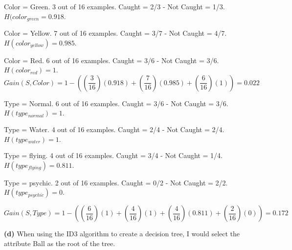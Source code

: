 \documentclass[11pt]{article}
\renewcommand\part[1]{\vspace{.10in}\textbf{(#1)}}
\begin{document}
 \par

Color = Green. 3 out of 16 examples. Caught = 2/3 - Not Caught = 1/3. $H(color_{green} = 0.918$.

Color = Yellow. 7 out of 16 examples. Caught = 3/7 - Not Caught = 4/7. $H(color_{yellow}) = 0.985$.

Color = Red. 6 out of 16 examples. Caught = 3/6 - Not Caught = 3/6. $H(color_{red}) = 1$.
$$Gain(S, Color) = 1 - ((\frac{3}{16})(0.918) + (\frac{7}{16})(0.985) + (\frac{6}{16})(1)) = 0.022$$

 \par 

Type = Normal. 6 out of 16 examples. Caught = 3/6 - Not Caught = 3/6. $H(type_{normal}) = 1$.

Type = Water. 4 out of 16 examples. Caught = 2/4 - Not Caught = 2/4. $H(type_{water}) = 1$.

Type = flying. 4 out of 16 examples. Caught = 3/4 - Not Caught = 1/4. $H(type_{flying}) = 0.811$.

Type = psychic. 2 out of 16 examples. Caught = 0/2 - Not Caught = 2/2. $H(type_{psychic}) = 0$.

$$Gain(S, Type) = 1 - ((\frac{6}{16})(1) + (\frac{4}{16})(1) + (\frac{4}{16})(0.811) + (\frac{2}{16})(0)) = 0.172$$

 \par 

\part{d} When using the ID3 algorithm to create a decision tree, I would select the attribute Ball as the root of the tree.

\setlength{\fboxsep}{4pt}
 \par 
\end{document}
